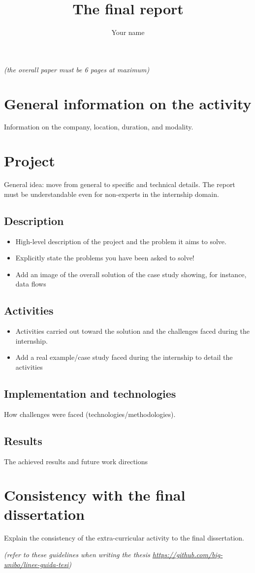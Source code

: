 \documentclass{article}
\title{The final report}
\author{Your name}
\begin{document}
\maketitle

\textit{(the overall paper must be 6 pages at maximum)}

\section{General information on the activity}
Information on the company, location, duration, and modality.

\section{Project}
General idea: move from general to specific and technical details.
The report must be understandable even for non-experts in the internship domain.

\subsection{Description}
\begin{itemize}
    \item High-level description of the project and the problem it aims to solve.
    \item Explicitly state the problems you have been asked to solve!
    \item Add an image of the overall solution of the case study showing, for instance, data flows
\end{itemize}

\subsection{Activities}
\begin{itemize}
    \item Activities carried out toward the solution and the challenges faced during the internship.
    \item Add a real example/case study faced during the internship to detail the activities
\end{itemize}

\subsection{Implementation and technologies}
How challenges were faced (technologies/methodologies).

\subsection{Results}
The achieved results and future work directions

\section{Consistency with the final dissertation}
Explain the consistency of the extra-curricular activity to the final dissertation. 

\textit{(refer to these guidelines when writing the thesis \url{https://github.com/big-unibo/linee-guida-tesi})}
\end{document}
